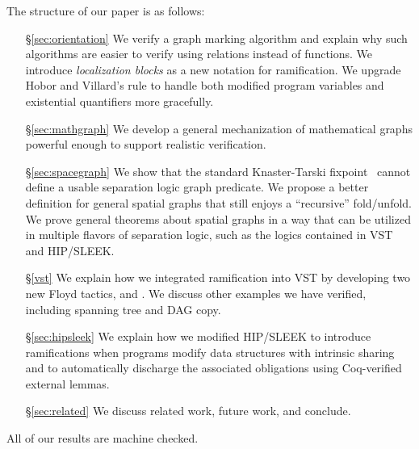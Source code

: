 The structure of our paper is as follows:
\begin{itemize}
\item[\S\ref{sec:orientation}] We verify a graph marking algorithm and explain why such algorithms are easier to verify using relations instead of functions.  We introduce \emph{localization blocks} as a new notation for ramification.  We upgrade Hobor and Villard's  rule to handle both modified program variables and existential quantifiers more gracefully.
\vspace{-0.1ex}
\item[\S\ref{sec:mathgraph}] We develop a general mechanization of mathematical graphs powerful enough to support realistic verification. %
\vspace{-0.1ex}
\item[\S\ref{sec:spacegraph}] We show that the standard Knaster-Tarski fixpoint~\cite{tarski:fixpoint} cannot define a usable separation logic graph predicate.  We propose a better definition for general spatial graphs that still enjoys a ``recursive'' fold/unfold.  We prove general theorems about spatial graphs in a way that can be utilized in multiple flavors of separation logic, such as the logics contained in VST and HIP/SLEEK.
\vspace{-0.1ex}
\item[\S\ref{vst}] We explain how we integrated ramification into VST by developing two new Floyd tactics,  and .  We discuss other examples we have verified, including spanning tree and DAG copy.
\vspace{-0.1ex}
\item[\S\ref{sec:hipsleek}] We explain how we modified HIP/SLEEK to introduce ramifications when programs modify data structures with intrinsic sharing and to automatically discharge the associated obligations using Coq-verified external lemmas.
\vspace{-0.1ex}
\item[\S\ref{sec:related}] We discuss related work, future work, and conclude.
\end{itemize}
All of our results are machine checked.

